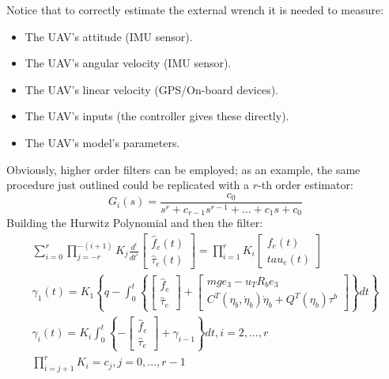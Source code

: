 Notice that to correctly estimate the external wrench it is needed to measure:
\begin{itemize}
    \item The UAV's attitude (IMU sensor).
    \item The UAV's angular velocity (IMU sensor).
    \item The UAV's linear velocity (GPS/On-board devices).
    \item The UAV's inputs (the controller gives these directly).
    \item The UAV's model's parameters.
\end{itemize}
Obviously, higher order filters can be employed; as an example, the same procedure just outlined could be replicated with a $r$-th order estimator:
\begin{equation*}
    G_i(s)=\frac{c_0}{s^r+c_{r-1}s^{r-1}+\dots+c_1s+c_0}
\end{equation*}
Building the Hurwitz Polynomial and then the filter:
\begin{gather*}
    \sum_{i=0}^{r} \prod_{j=-r}^{-(i+1)}{K_j\frac{d^i}{dt^i}
    \begin{bmatrix}
        \hat{f}_e(t) \\ \hat{\tau}_e(t)    
    \end{bmatrix}}=
    \prod_{i=1}^{r}K_i 
    \begin{bmatrix}
        f_e(t) \\ tau_e(t)
    \end{bmatrix}\\
    \gamma_1(t)=K_1\left\{q-\int_{0}^{t}\left\{
    \begin{bmatrix}
        \hat{f}_e \\ \hat{\tau}_e
    \end{bmatrix}+
    \begin{bmatrix}
        mge_3-u_{T}R_be_3\\
        C^{T}(\eta_b,\dot{\eta}_b)\dot{\eta}_b+Q^{T}(\eta_b)\tau^b
    \end{bmatrix}
    \right\}dt
    \right\}\\
    \gamma_i(t)=K_i \int_{0}^{t}\left\{
    -\begin{bmatrix}
        \hat{f}_e\\ \hat{\tau}_e
    \end{bmatrix}+\gamma_{i-1}
    \right\}dt, i=2,\dots,r\\
    \prod_{i=j+1}^{r}K_i=c_j,j=0,\dots,r-1
\end{gather*}
